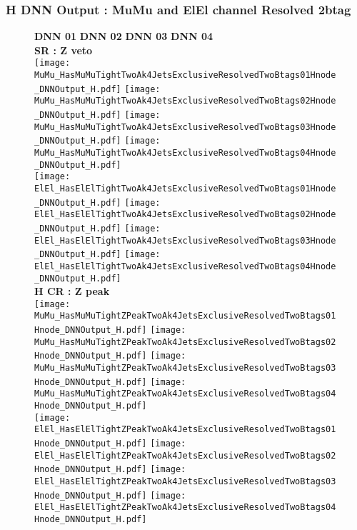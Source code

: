 \documentclass[9pt]{beamer}
\begin{document}
\begin{frame}
	\frametitle{H DNN Output : MuMu and ElEl channel Resolved 2btag}
	\begin{figure}
	    \textbf{DNN 01} \hspace{1.2cm} \textbf{DNN 02} \hspace{1.2cm} \textbf{DNN 03} \hspace{1.2cm} \textbf{DNN 04} \\
        \centering
        \textbf{SR : Z veto} \\
		\texttt{[image: MuMu\_HasMuMuTightTwoAk4JetsExclusiveResolvedTwoBtags01Hnode\_DNNOutput\_H.pdf]}
		\texttt{[image: MuMu\_HasMuMuTightTwoAk4JetsExclusiveResolvedTwoBtags02Hnode\_DNNOutput\_H.pdf]}
		\texttt{[image: MuMu\_HasMuMuTightTwoAk4JetsExclusiveResolvedTwoBtags03Hnode\_DNNOutput\_H.pdf]}
		\texttt{[image: MuMu\_HasMuMuTightTwoAk4JetsExclusiveResolvedTwoBtags04Hnode\_DNNOutput\_H.pdf]}\\
		\texttt{[image: ElEl\_HasElElTightTwoAk4JetsExclusiveResolvedTwoBtags01Hnode\_DNNOutput\_H.pdf]}
		\texttt{[image: ElEl\_HasElElTightTwoAk4JetsExclusiveResolvedTwoBtags02Hnode\_DNNOutput\_H.pdf]}
		\texttt{[image: ElEl\_HasElElTightTwoAk4JetsExclusiveResolvedTwoBtags03Hnode\_DNNOutput\_H.pdf]}
		\texttt{[image: ElEl\_HasElElTightTwoAk4JetsExclusiveResolvedTwoBtags04Hnode\_DNNOutput\_H.pdf]}\\
        \textbf{H CR : Z peak} \\
		\texttt{[image: MuMu\_HasMuMuTightZPeakTwoAk4JetsExclusiveResolvedTwoBtags01Hnode\_DNNOutput\_H.pdf]}
		\texttt{[image: MuMu\_HasMuMuTightZPeakTwoAk4JetsExclusiveResolvedTwoBtags02Hnode\_DNNOutput\_H.pdf]}
		\texttt{[image: MuMu\_HasMuMuTightZPeakTwoAk4JetsExclusiveResolvedTwoBtags03Hnode\_DNNOutput\_H.pdf]}
		\texttt{[image: MuMu\_HasMuMuTightZPeakTwoAk4JetsExclusiveResolvedTwoBtags04Hnode\_DNNOutput\_H.pdf]}\\
		\texttt{[image: ElEl\_HasElElTightZPeakTwoAk4JetsExclusiveResolvedTwoBtags01Hnode\_DNNOutput\_H.pdf]}
		\texttt{[image: ElEl\_HasElElTightZPeakTwoAk4JetsExclusiveResolvedTwoBtags02Hnode\_DNNOutput\_H.pdf]}
		\texttt{[image: ElEl\_HasElElTightZPeakTwoAk4JetsExclusiveResolvedTwoBtags03Hnode\_DNNOutput\_H.pdf]}
		\texttt{[image: ElEl\_HasElElTightZPeakTwoAk4JetsExclusiveResolvedTwoBtags04Hnode\_DNNOutput\_H.pdf]}\\
	\end{figure}
\end{frame}
\end{document}
